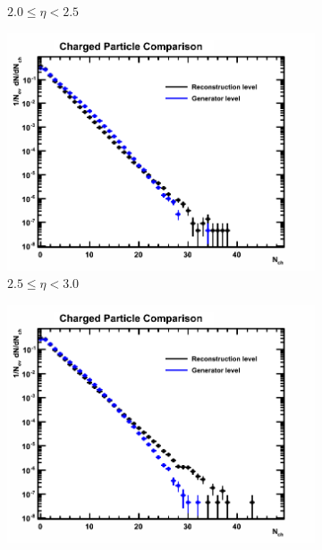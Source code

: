 \begin{figure}[h]
\begin{subfigure}[h]{0.32\textwidth}
		\caption{$2.0 \le \eta < 2.5$}
		\label{fig: reconstructed track multiplicity mc down 2.0 - 2.5}
	\end{subfigure}
	\begin{subfigure}[h]{0.32\textwidth}
		\includegraphics[width=\textwidth]{./Chapters/multiplicity/charged_particle_event_multiplicity/images/reco_gen_comparison/2_5-3_0.png}
		\caption{$2.5 \le \eta < 3.0$}
		\label{fig: reconstructed track multiplicity mc down 2.5 - 3.0}
	\end{subfigure}
	\begin{subfigure}[h]{0.32\textwidth}
		\includegraphics[width=\textwidth]{./Chapters/multiplicity/charged_particle_event_multiplicity/images/reco_gen_comparison/3_0-3_5.png}

\end{subfigure}
\end{figure}
